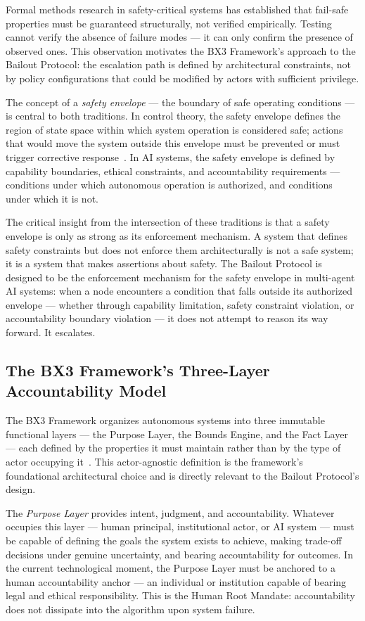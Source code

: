 Formal methods research in safety-critical systems has established that fail-safe properties must be guaranteed structurally, not verified empirically. Testing cannot verify the absence of failure modes — it can only confirm the presence of observed ones. This observation motivates the BX3 Framework's approach to the Bailout Protocol: the escalation path is defined by architectural constraints, not by policy configurations that could be modified by actors with sufficient privilege.

The concept of a \textit{safety envelope} — the boundary of safe operating conditions — is central to both traditions. In control theory, the safety envelope defines the region of state space within which system operation is considered safe; actions that would move the system outside this envelope must be prevented or must trigger corrective response~\cite{wiener1948}. In AI systems, the safety envelope is defined by capability boundaries, ethical constraints, and accountability requirements — conditions under which autonomous operation is authorized, and conditions under which it is not.

The critical insight from the intersection of these traditions is that a safety envelope is only as strong as its enforcement mechanism. A system that defines safety constraints but does not enforce them architecturally is not a safe system; it is a system that makes assertions about safety. The Bailout Protocol is designed to be the enforcement mechanism for the safety envelope in multi-agent AI systems: when a node encounters a condition that falls outside its authorized envelope — whether through capability limitation, safety constraint violation, or accountability boundary violation — it does not attempt to reason its way forward. It escalates.

\subsection{The BX3 Framework's Three-Layer Accountability Model}

The BX3 Framework organizes autonomous systems into three immutable functional layers — the Purpose Layer, the Bounds Engine, and the Fact Layer — each defined by the properties it must maintain rather than by the type of actor occupying it~\cite{bx3framework2026}. This actor-agnostic definition is the framework's foundational architectural choice and is directly relevant to the Bailout Protocol's design.

The \textit{Purpose Layer} provides intent, judgment, and accountability. Whatever occupies this layer — human principal, institutional actor, or AI system — must be capable of defining the goals the system exists to achieve, making trade-off decisions under genuine uncertainty, and bearing accountability for outcomes. In the current technological moment, the Purpose Layer must be anchored to a human accountability anchor — an individual or institution capable of bearing legal and ethical responsibility. This is the Human Root Mandate: accountability does not dissipate into the algorithm upon system failure.

